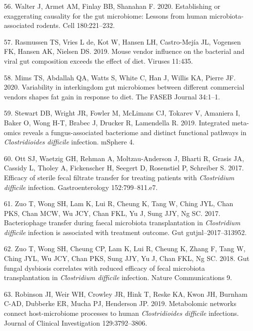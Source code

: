 \documentclass[11pt,]{article}
\begin{document}
\hypertarget{ref-Walter2020}{}
56. Walter J, Armet AM, Finlay BB, Shanahan F. 2020. Establishing or
exaggerating causality for the gut microbiome: Lessons from human
microbiota-associated rodents. Cell 180:221--232.

\hypertarget{ref-Rasmussen2019}{}
57. Rasmussen TS, Vries L de, Kot W, Hansen LH, Castro-Mejía JL,
Vogensen FK, Hansen AK, Nielsen DS. 2019. Mouse vendor influence on the
bacterial and viral gut composition exceeds the effect of diet. Viruses
11:435.

\hypertarget{ref-Mims2020}{}
58. Mims TS, Abdallah QA, Watts S, White C, Han J, Willis KA, Pierre JF.
2020. Variability in interkingdom gut microbiomes between different
commercial vendors shapes fat gain in response to diet. The FASEB
Journal 34:1--1.

\hypertarget{ref-Stewart2019}{}
59. Stewart DB, Wright JR, Fowler M, McLimans CJ, Tokarev V, Amaniera I,
Baker O, Wong H-T, Brabec J, Drucker R, Lamendella R. 2019. Integrated
meta-omics reveals a fungus-associated bacteriome and distinct
functional pathways in \emph{Clostridioides difficile} infection.
mSphere 4.

\hypertarget{ref-Ott2017}{}
60. Ott SJ, Waetzig GH, Rehman A, Moltzau-Anderson J, Bharti R, Grasis
JA, Cassidy L, Tholey A, Fickenscher H, Seegert D, Rosenstiel P,
Schreiber S. 2017. Efficacy of sterile fecal filtrate transfer for
treating patients with \emph{Clostridium difficile} infection.
Gastroenterology 152:799--811.e7.

\hypertarget{ref-Zuo2017}{}
61. Zuo T, Wong SH, Lam K, Lui R, Cheung K, Tang W, Ching JYL, Chan PKS,
Chan MCW, Wu JCY, Chan FKL, Yu J, Sung JJY, Ng SC. 2017. Bacteriophage
transfer during faecal microbiota transplantation in \emph{Clostridium
difficile} infection is associated with treatment outcome. Gut
gutjnl--2017--313952.

\hypertarget{ref-Zuo2018}{}
62. Zuo T, Wong SH, Cheung CP, Lam K, Lui R, Cheung K, Zhang F, Tang W,
Ching JYL, Wu JCY, Chan PKS, Sung JJY, Yu J, Chan FKL, Ng SC. 2018. Gut
fungal dysbiosis correlates with reduced efficacy of fecal microbiota
transplantation in \emph{Clostridium difficile} infection. Nature
Communications 9.

\hypertarget{ref-Robinson2019}{}
63. Robinson JI, Weir WH, Crowley JR, Hink T, Reske KA, Kwon JH, Burnham
C-AD, Dubberke ER, Mucha PJ, Henderson JP. 2019. Metabolomic networks
connect host-microbiome processes to human \emph{Clostridioides
difficile} infections. Journal of Clinical Investigation 129:3792--3806.
\end{document}
